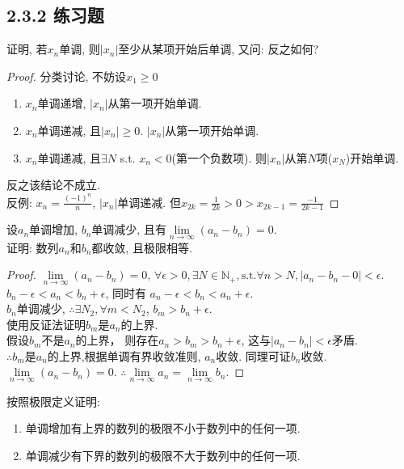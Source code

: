 \subsection{2.3.2 练习题}
\begin{qs}
	证明, 若{$ x_n $}单调, 则{$ |x_n| $}至少从某项开始后单调, 又问: 反之如何?
\end{qs}
\begin{proof}
	分类讨论, 不妨设$ x_1 \geqslant 0 $\\
	\begin{enumerate}
		\item {$ x_n $}单调递增, {$ |x_n| $}从第一项开始单调.
		\item {$ x_n $}单调递减, 且$ |x_n| \geqslant 0 $. {$ |x_n| $}从第一项开始单调.
		\item {$ x_n $}单调递减, 且$ \exists N $ s.t.  $ x_n <0 $(第一个负数项). 则{$ |x_n| $}从第$ N $项($ x_N $)开始单调.
	\end{enumerate}
	反之该结论不成立.\\
	反例: $ x_n =\frac{(-1)^n}{n} $, {$ |x_n| $}单调递减.
	但$ x_{2k} = \frac{1}{2k} >0 >x_{2k-1} = \frac{-1}{2k-1} $
\end{proof}

\begin{qs}
	设{$ a_n $}单调增加, {$ b_n $}单调减少, 且有$ \lim\limits_{n\rightarrow\infty}(a_n-b_n)=0 $.\\
	证明: 数列{$ a_n $}和{$ b_n $}都收敛, 且极限相等.
\end{qs}
\begin{proof}
	$ \lim\limits_{n\rightarrow\infty}(a_n-b_n) = 0 $, $ \forall \epsilon > 0, \exists N\in\mathbb{N}_+, \text{s.t.} \forall n>N, |a_n-b_n-0|< \epsilon $.\\
	$ b_n-\epsilon <a_n<b_n+\epsilon $, 同时有 $ a_n-\epsilon <b_n<a_n+\epsilon $.\\
	{$ b_n $}单调减少, $ \therefore \exists N_2, \forall m<N_2 $, $ b_m>b_n+\epsilon $.\\
	使用反证法证明$ b_m $是{$ a_n $}的上界.\\
	假设$ b_m $不是{$ a_n $}的上界， 则存在$ a_{n}>b_m >b_{n}+\epsilon $, 这与$ |a_n-b_n|<\epsilon $矛盾.\\
	$ \therefore b_m $是{$ a_n $}的上界,根据单调有界收敛准则, {$ a_n $}收敛. 同理可证{$ b_n $}收敛. $ \lim\limits_{n\rightarrow\infty}(a_n-b_n)=0 $. $ \therefore  $$ \lim\limits_{n\rightarrow\infty}a_n = \lim\limits_{n\rightarrow\infty}b_n $.
\end{proof}

\begin{qs}
	按照极限定义证明:\\
	\begin{enumerate}
		\item  单调增加有上界的数列的极限不小于数列中的任何一项.
		\item  单调减少有下界的数列的极限不大于数列中的任何一项.
	\end{enumerate}
\end{qs}


